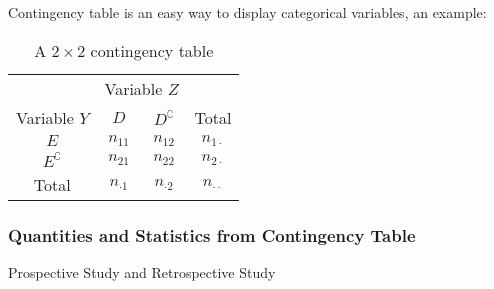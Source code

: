 Contingency table is an easy way to display categorical variables, an example:
\begin{table}[H]
    \centering
    \renewcommand\arraystretch{1}
    \caption{A $ 2\times 2 $ contingency table}
    \begin{tabular}{cccc}
        \hline
        \hline
        &\multicolumn{2}{c}{Variable $ Z $}&\\
        \cline{2-3}
        Variable $ Y $&$ D $&$ D^\complement $&Total\\
        \hline
        $ E $&$ n_{11} $&$ n_{12} $&$ n_{1\cdot } $\\
        $ E^\complement  $&$ n_{21} $&$ n_{22} $&$ n_{2\cdot } $\\
        \hline
        Total&$ n_{\cdot 1} $&$ n_{\cdot 2} $&$ n_{\cdot \cdot } $\\
        \hline
        \hline
    \end{tabular}
    \label{}
\end{table}
      

\subsubsection{Quantities and Statistics from Contingency Table}\label{SubSubSectionContingencyTableInBioStat}

\begin{point}
    Prospective Study and Retrospective Study
\end{point}

